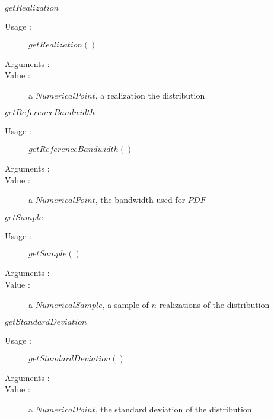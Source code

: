 \begin{description}
\begin{description}
  \item $getRealization$
    \begin{description}
    \item[Usage :]  $getRealization()$
    \item[Arguments :]  \strut
    \item[Value :] a $NumericalPoint$, a realization the distribution
    \end{description}

  \item $getReferenceBandwidth$
    \begin{description}
    \item[Usage :]  $getReferenceBandwidth()$
    \item[Arguments :]  \strut
    \item[Value :] a $NumericalPoint$, the bandwidth used for $PDF$
    \end{description}

  \item $getSample$
    \begin{description}
    \item[Usage :]  $getSample()$
    \item[Arguments :]  \strut
    \item[Value :] a $NumericalSample$, a sample of $n$ realizations of the distribution
    \end{description}

  \item $getStandardDeviation$
    \begin{description}
    \item[Usage :]  $getStandardDeviation()$
    \item[Arguments :]  \strut
    \item[Value :] a $NumericalPoint$, the standard deviation of the distribution
    \end{description}


\end{description}
\end{description}
